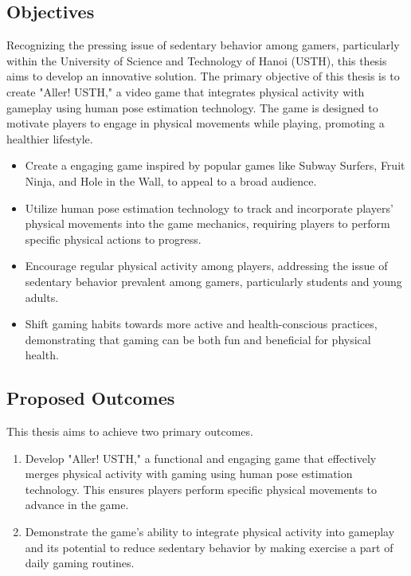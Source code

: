 \documentclass[12pt]{article}
\begin{document}
\subsection{Objectives}
\hspace*{1.5em}Recognizing the pressing issue of sedentary behavior among gamers, particularly within the University of Science and Technology of Hanoi (USTH), this thesis aims to develop an innovative solution.
The primary objective of this thesis is to create "Aller! USTH," a video game that integrates physical activity with gameplay using human pose estimation technology. The game is designed to motivate players to engage in physical movements while playing, promoting a healthier lifestyle.

\begin{itemize}
    \item Create a engaging game inspired by popular games like Subway Surfers, Fruit Ninja, and Hole in the Wall, to appeal to a broad audience.
    \item Utilize human pose estimation technology to track and incorporate players' physical movements into the game mechanics, requiring players to perform specific physical actions to progress.
    \item Encourage regular physical activity among players, addressing the issue of sedentary behavior prevalent among gamers, particularly students and young adults.
    \item Shift gaming habits towards more active and health-conscious practices, demonstrating that gaming can be both fun and beneficial for physical health.
\end{itemize}

\subsection{Proposed Outcomes}
\hspace*{1.5em}This thesis aims to achieve two primary outcomes.

\begin{enumerate}
    \item Develop "Aller! USTH," a functional and engaging game that effectively merges physical activity with gaming using human pose estimation technology. This ensures players perform specific physical movements to advance in the game.
    \item Demonstrate the game's ability to integrate physical activity into gameplay and its potential to reduce sedentary behavior by making exercise a part of daily gaming routines.
\end{enumerate}
\end{document}
